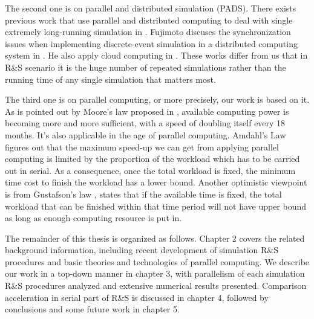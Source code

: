 The second one is on parallel and distributed simulation (PADS). There exists previous work that use parallel and distributed computing to deal with single extremely long-running simulation in \cite{potwsc05ras}. Fujimoto discuses the synchronization issues when implementing discrete-event simulation in a distributed computing system in \cite{cotacm90fuji}. He also apply cloud computing in \cite{scsmasm10fuji}. These works differ from us that in R\&S scenario it is the huge number of repeated simulations rather than the running time of any single simulation that matters most.

The third one is on parallel computing, or more precisely, our work is based on it. As is pointed out by Moore's law proposed in \cite{moore}, available computing power is becoming more and more sufficient, with a speed of doubling itself every 18 months. It's also applicable in the age of parallel computing. Amdahl's Law \cite{amdahl} figures out that the maximum speed-up we can get from applying parallel computing is limited by the proportion of the workload which has to be carried out in serial. As a consequence, once the total workload is fixed, the minimum time cost to finish the workload has a lower bound. Another optimistic viewpoint is from Gustafson's law \cite{gustafson}, states that if the available time is fixed, the total workload that can be finished within that time period will not have upper bound as long as enough computing resource is put in.

The remainder of this thesis is organized as follows. Chapter 2 covers the related background information, including recent development of simulation R\&S procedures and basic theories and technologies of parallel computing. We describe our work in a top-down manner in chapter 3, with parallelism of each simulation R\&S procedures analyzed and extensive numerical results presented. Comparison acceleration in serial part of R\&S is discussed in chapter 4, followed by conclusions and some future work in chapter 5.
